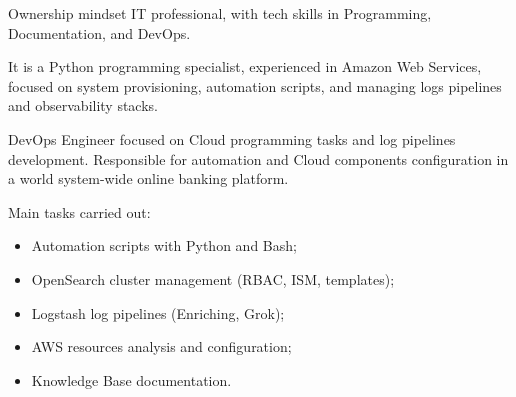 \documentclass[10pt,a4paper]{altacv}
\begin{document}



\begin{fullwidth}
    \makecvheader
\end{fullwidth}



Ownership mindset IT professional, with tech skills in Programming, Documentation, and DevOps.

\bigskip

It is a Python programming specialist, experienced in Amazon Web Services, focused on system provisioning, automation scripts, and managing logs pipelines and observability stacks.



DevOps Engineer focused on Cloud programming tasks and log pipelines development. Responsible for automation and Cloud components configuration in a world system-wide online banking platform.

\bigskip

Main tasks carried out:

\bigskip

\begin{itemize}
    \item Automation scripts with Python and Bash;
    \item OpenSearch cluster management (RBAC, ISM, templates);
    \item Logstash log pipelines (Enriching, Grok);
    \item AWS resources analysis and configuration;
    \item Knowledge Base documentation.
\end{itemize}    

\divider
\end{document}
